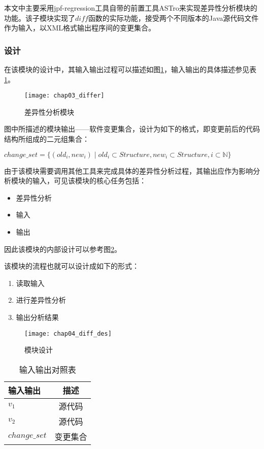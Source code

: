 本文中主要采用jpf-regression工具自带的前置工具ASTro来实现差异性分析模块的功能。该子模块实现了$diff$函数的实际功能，接受两个不同版本的Java源代码文件作为输入，以XML格式输出程序间的变更集合。

\subsubsection{设计}

在该模块的设计中，其输入输出过程可以描述如图\ref {differ}，输入输出的具体描述参见表\ref {differ_io}。

\begin{figure}[H]
	\centering
	\texttt{[image: chap03\_differ]}
	\caption {差异性分析模块}
	\label {differ}	
\end{figure}

图中所描述的模块输出——软件变更集合，设计为如下的格式，即变更前后的代码结构所组成的二元组集合：
\begin{definition}
	$ change\_set = \{ (old_i,new_i) \mid  old_i \subset Structure,new_i \subset Structure, i \subset \mathbb{N} \}$
\end{definition}

由于该模块需要调用其他工具来完成具体的差异性分析过程，其输出应作为影响分析模块的输入，可见该模块的核心任务包括：
\begin{itemize}
	\item 差异性分析
	\item 输入
	\item 输出
\end{itemize}

因此该模块的内部设计可以参考图\ref {des_diff}。

该模块的流程也就可以设计成如下的形式：
\begin{enumerate}
	\item 读取输入
	\item 进行差异性分析
	\item 输出分析结果
\end{enumerate}

\begin{figure}[H]
	\centering
	\texttt{[image: chap04\_diff\_des]}
	\caption {模块设计}
	\label {des_diff}	
\end{figure}


\begin{table}
	\caption{输入输出对照表}
	\label{differ_io}
	\centering
	\begin{tabular}{lc}
		\toprule[1.5pt]
		{\heiti 输入输出} & {\heiti 描述}\\\midrule[1pt]
		$v_1$ & 源代码 \\
		$v_2$ & 源代码 \\
		$change\_set$ & 变更集合 \\
		\bottomrule[1.5pt]
	\end{tabular}
\end{table}

